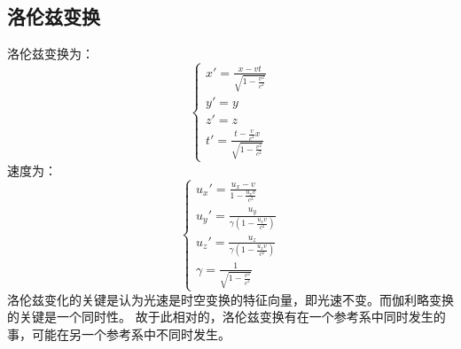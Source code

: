 \documentclass{ctexart}
\begin{document}
\subsection{洛伦兹变换}
洛伦兹变换为：
\begin{equation*}
    \begin{cases}
        x' = \frac{x - vt}{\sqrt{1 - \frac{v^2}{c^2}}} \\
        y' = y \\
        z' = z \\
        t' = \frac{t - \frac{v}{c^2}x}{\sqrt{1 - \frac{v^2}{c^2}}}
    \end{cases}
\end{equation*}
速度为：
\begin{equation*}
    \begin{cases}
        u_x' = \frac{u_x-v}{1-\frac{u_xv}{c^2}} \\
        u_y' = \frac{u_y}{\gamma(1-\frac{u_xv}{c^2})} \\
        u_z' = \frac{u_z}{\gamma(1-\frac{u_xv}{c^2})} \\
        \gamma = \frac{1}{\sqrt{1-\frac{v^2}{c^2}}}
    \end{cases}
\end{equation*}
洛伦兹变化的关键是认为光速是时空变换的特征向量，即光速不变。而伽利略变换的关键是一个同时性。
故于此相对的，洛伦兹变换有在一个参考系中同时发生的事，可能在另一个参考系中不同时发生。
\end{document}
